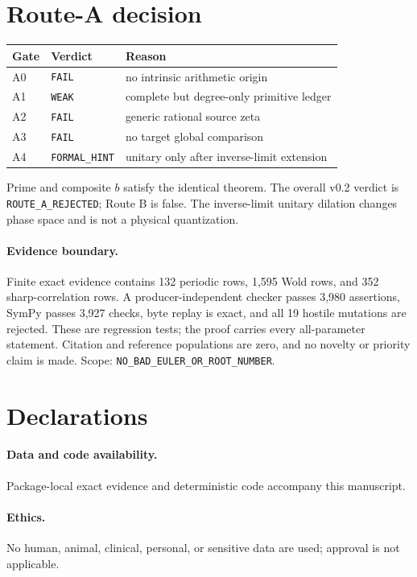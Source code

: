 \documentclass[10pt]{article}
\begin{document}
\section{Route-A decision}
\begin{center}\small
\begin{tabular}{lll}
\toprule Gate&Verdict&Reason\\
\midrule
A0&\texttt{FAIL}&no intrinsic arithmetic origin\\
A1&\texttt{WEAK}&complete but degree-only primitive ledger\\
A2&\texttt{FAIL}&generic rational source zeta\\
A3&\texttt{FAIL}&no target global comparison\\
A4&\texttt{FORMAL\_HINT}&unitary only after inverse-limit extension\\
\bottomrule
\end{tabular}
\end{center}
Prime and composite $b$ satisfy the identical theorem.  The overall v0.2
verdict is \texttt{ROUTE\_A\_REJECTED}; Route B is false.  The inverse-limit
unitary dilation changes phase space and is not a physical quantization.

\paragraph{Evidence boundary.}
Finite exact evidence contains 132 periodic rows, 1{,}595 Wold rows, and 352
sharp-correlation rows.  A producer-independent checker passes 3{,}980
assertions, SymPy passes 3{,}927 checks, byte replay is exact, and all 19
hostile mutations are rejected.  These are regression tests; the proof
carries every all-parameter statement. Citation and reference populations
are zero, and no novelty or priority claim is made. Scope:
\texttt{NO\_BAD\_EULER\_OR\_ROOT\_NUMBER}.

\section*{Declarations}
\paragraph{Data and code availability.} Package-local exact evidence and
deterministic code accompany this manuscript.
\paragraph{Ethics.} No human, animal, clinical, personal, or sensitive data
are used; approval is not applicable.
\end{document}

